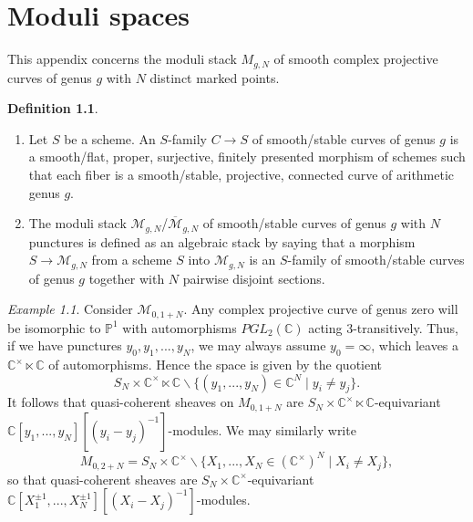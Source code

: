 \documentclass[11pt]{report}
\theoremstyle{definition}
\newtheorem{definition}[theorem]{Definition}
\theoremstyle{remark}
\theoremstyle{remark}
\newtheorem*{example}{Example}
\newcommand{\C}{\mathbb{C}}
\renewcommand{\P}{\mathbb{P}}
\begin{document}
\chapter{Moduli spaces}\label{appendix:moduliSpaces}

This appendix concerns the moduli stack $M_{g,N}$ of smooth complex projective curves of genus $g$ with $N$ distinct marked points.

\begin{definition}
\begin{enumerate}[label=(\roman*)]
\item Let $S$ be a scheme. An $S$-family $C \to S$ of smooth/stable curves of genus $g$ is a smooth/flat, proper, surjective, finitely presented morphism of schemes such that each fiber is a smooth/stable, projective, connected curve of arithmetic genus $g$.
\item The moduli stack $\mathcal{M}_{g,N}$/$\overline{\mathcal{M}}_{g,N}$ of smooth/stable curves of genus $g$ with $N$ punctures is defined as an algebraic stack by saying that a morphism $S \to \mathcal{M}_{g,N}$ from a scheme $S$ into $\mathcal{M}_{g,N}$ is an $S$-family of smooth/stable curves of genus $g$ together with $N$ pairwise disjoint sections.
\end{enumerate}
\end{definition}

\begin{example}
Consider $\mathcal{M}_{0,1+N}$. Any complex projective curve of genus zero will be isomorphic to $\P^1$ with automorphisms $PGL_2(\C)$ acting 3-transitively. Thus, if we have punctures $y_0,y_1,...,y_N$, we may always assume $y_0=\infty$, which leaves a $\C^\times \ltimes \C$ of automorphisms. Hence the space is given by the quotient
\begin{equation*}
S_N \times \C^\times \ltimes \C \backslash \{ (y_1,...,y_N) \in \C^N \mid y_i \neq y_j \}.
\end{equation*}
It follows that quasi-coherent sheaves on $M_{0,1+N}$ are $S_N \times \C^\times \ltimes \C$-equivariant $\C[y_1,...,y_N][(y_i-y_j)^{-1}]$-modules. We may similarly write
\begin{equation*}
M_{0,2+N} = S_N \times \C^\times \backslash \{ X_1,...,X_N \in (\C^\times)^N \mid X_i \neq X_j \},
\end{equation*}
so that quasi-coherent sheaves are $S_N \times \C^\times$-equivariant $\C[X_1^{\pm 1},...,X_N^{\pm 1}][(X_i-X_j)^{-1}]$-modules.
\end{example}
\end{document}
